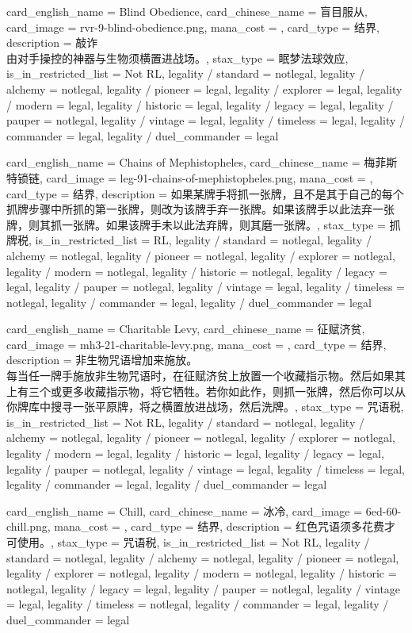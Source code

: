 \documentclass[lang = cn, color = black, 10pt]{AllThatStax}
\begin{document}
\card
{
	card_english_name = {Blind Obedience},
	card_chinese_name = {盲目服从},
	card_image = rvr-9-blind-obedience.png,
	mana_cost = ,
	card_type = 结界,
	description = {敲诈\\
由对手操控的神器与生物须横置进战场。},
	stax_type = 眠梦法球效应,
	is_in_restricted_list = Not RL,
	legality / standard = notlegal,
	legality / alchemy = notlegal,
	legality / pioneer = legal,
	legality / explorer = legal,
	legality / modern = legal,
	legality / historic = legal,
	legality / legacy = legal,
	legality / pauper = notlegal,
	legality / vintage = legal,
	legality / timeless = legal,
	legality / commander = legal,
	legality / duel_commander = legal
}

\card
{
	card_english_name = {Chains of Mephistopheles},
	card_chinese_name = {梅菲斯特锁链},
	card_image = leg-91-chains-of-mephistopheles.png,
	mana_cost = ,
	card_type = 结界,
	description = {如果某牌手将抓一张牌，且不是其于自己的每个抓牌步骤中所抓的第一张牌，则改为该牌手弃一张牌。如果该牌手以此法弃一张牌，则其抓一张牌。如果该牌手未以此法弃牌，则其磨一张牌。},
	stax_type = 抓牌税,
	is_in_restricted_list = RL,
	legality / standard = notlegal,
	legality / alchemy = notlegal,
	legality / pioneer = notlegal,
	legality / explorer = notlegal,
	legality / modern = notlegal,
	legality / historic = notlegal,
	legality / legacy = legal,
	legality / pauper = notlegal,
	legality / vintage = legal,
	legality / timeless = notlegal,
	legality / commander = legal,
	legality / duel_commander = legal
}

\card
{
	card_english_name = {Charitable Levy},
	card_chinese_name = {征赋济贫},
	card_image = mh3-21-charitable-levy.png,
	mana_cost = ,
	card_type = 结界,
	description = {非生物咒语增加来施放。\\
每当任一牌手施放非生物咒语时，在征赋济贫上放置一个收藏指示物。然后如果其上有三个或更多收藏指示物，将它牺牲。若你如此作，则抓一张牌，然后你可以从你牌库中搜寻一张平原牌，将之横置放进战场，然后洗牌。},
	stax_type = 咒语税,
	is_in_restricted_list = Not RL,
	legality / standard = notlegal,
	legality / alchemy = notlegal,
	legality / pioneer = notlegal,
	legality / explorer = notlegal,
	legality / modern = legal,
	legality / historic = legal,
	legality / legacy = legal,
	legality / pauper = notlegal,
	legality / vintage = legal,
	legality / timeless = legal,
	legality / commander = legal,
	legality / duel_commander = legal
}

\card
{
	card_english_name = {Chill},
	card_chinese_name = {冰冷},
	card_image = 6ed-60-chill.png,
	mana_cost = ,
	card_type = 结界,
	description = {红色咒语须多花费才可使用。},
	stax_type = 咒语税,
	is_in_restricted_list = Not RL,
	legality / standard = notlegal,
	legality / alchemy = notlegal,
	legality / pioneer = notlegal,
	legality / explorer = notlegal,
	legality / modern = notlegal,
	legality / historic = notlegal,
	legality / legacy = legal,
	legality / pauper = notlegal,
	legality / vintage = legal,
	legality / timeless = notlegal,
	legality / commander = legal,
	legality / duel_commander = legal
}
\end{document}
